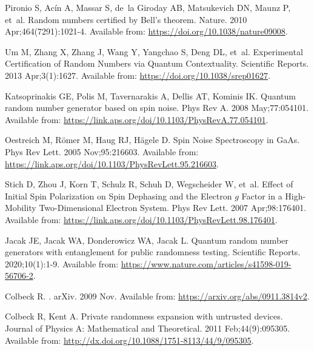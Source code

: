 \documentclass[]{interact}
\theoremstyle{plain}%
\theoremstyle{definition}
\theoremstyle{remark}
\begin{document}
\begin{thebibliography}{100}
Pironio S, Ac{\'i}n A, Massar S, de~la Giroday AB, Matsukevich DN, Maunz P,
  et~al.
\newblock Random numbers certified by Bell's theorem.
\newblock Nature. 2010 Apr;464(7291):1021-4.
\newblock Available from: \url{https://doi.org/10.1038/nature09008}.

Um M, Zhang X, Zhang J, Wang Y, Yangchao S, Deng DL, et~al.
\newblock Experimental Certification of Random Numbers via Quantum
  Contextuality.
\newblock Scientific Reports. 2013 Apr;3(1):1627.
\newblock Available from: \url{https://doi.org/10.1038/srep01627}.

Katsoprinakis GE, Polis M, Tavernarakis A, Dellis AT, Kominis IK.
\newblock Quantum random number generator based on spin noise.
\newblock Phys Rev A. 2008 May;77:054101.
\newblock Available from:
  \url{https://link.aps.org/doi/10.1103/PhysRevA.77.054101}.

Oestreich M, R\"omer M, Haug RJ, H\"agele D.
\newblock Spin Noise Spectroscopy in GaAs.
\newblock Phys Rev Lett. 2005 Nov;95:216603.
\newblock Available from:
  \url{https://link.aps.org/doi/10.1103/PhysRevLett.95.216603}.

Stich D, Zhou J, Korn T, Schulz R, Schuh D, Wegscheider W, et~al.
\newblock Effect of Initial Spin Polarization on Spin Dephasing and the
  Electron $g$ Factor in a High-Mobility Two-Dimensional Electron System.
\newblock Phys Rev Lett. 2007 Apr;98:176401.
\newblock Available from:
  \url{https://link.aps.org/doi/10.1103/PhysRevLett.98.176401}.

Jacak JE, Jacak WA, Donderowicz WA, Jacak L.
\newblock Quantum random number generators with entanglement for public
  randomness testing.
\newblock Scientific Reports. 2020;10(1):1-9.
\newblock Available from:
  \url{https://www.nature.com/articles/s41598-019-56706-2}.

Colbeck R.
.
\newblock arXiv. 2009 Nov.
\newblock Available from: \url{https://arxiv.org/abs/0911.3814v2}.

Colbeck R, Kent A.
\newblock Private randomness expansion with untrusted devices.
\newblock Journal of Physics A: Mathematical and Theoretical. 2011
  Feb;44(9):095305.
\newblock Available from:
  \url{http://dx.doi.org/10.1088/1751-8113/44/9/095305}.


\end{thebibliography}
\end{document}
